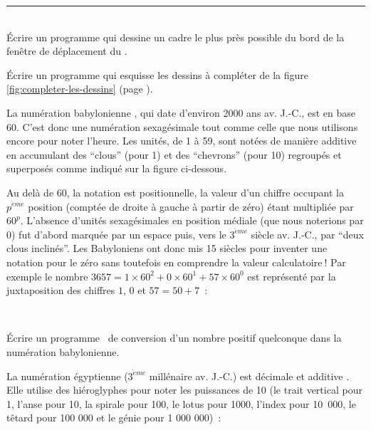 \vfill

\noindent \rule{137mm}{0.1mm} %

\noindent\begin{exercices}{\ \\

\tiret Écrire un programme qui dessine un cadre le plus près possible du bord de la fenêtre de déplacement
du \robot.

\tiret Écrire un programme qui esquisse les dessins à  compléter de la figure \ref{fig:completer-les-dessins} 
(page \pageref{fig:completer-les-dessins}).

\tiret La numération babylonienne \cite{guitel}, qui date d'environ 2000 ans av. J.-C., est en
base 60. C'est donc une numération sexagésimale tout comme celle que nous utilisons encore
pour noter l'heure. Les unités, de 1 à 59, sont notées de manière additive en accumulant des ``clous'' (pour
1) et des ``chevrons'' (pour 10) regroupés et superposés comme indiqué sur la figure
ci-dessous.\\[3.9cm]
\noindent{}%

\noindent Au delà de 60, la notation est positionnelle, la valeur d'un chiffre occupant
la $p^{\grave{e}me}$ position (comptée de droite à gauche à partir de zéro) étant
multipliée par $60^{p}$. L'absence d'unités sexagésimales en position médiale (que
nous no\-te\-rions par 0) fut d'abord marquée par un espace puis, vers le $3^{\grave{e}me}$
siècle av. J.-C., par ``deux clous inclinés''. Les Babyloniens ont donc mis 15 siècles pour
inventer une notation pour le
zéro sans toutefois en comprendre la valeur calculatoire$\:$! Par exemple 
le nombre $3657 = 1 \times 60^{2} + 0 \times 60^{1} + 57 \times 60^{0}$
est représenté par la juxtaposition des chiffres $1$, $0$ et 
$57 = 50 + 7$~:

\pagebreak
\mbox{}\\[1.9cm]
\noindent{}%

Écrire un programme \ocaml\ de conversion
d'un nombre po\-si\-tif quel\-con\-que dans la nu\-mé\-ra\-tion babylonienne. 

\tiret La numération égyptienne ($3^{\grave{e}me}$ 
millénaire av. J.-C.) est décimale et additive \cite{guitel}. Elle utilise des hiéroglyphes pour 
noter les
puissances de 10 (le trait vertical pour 1, l'anse pour 10, la spirale pour 100, le lotus pour 1000,
l'index pour 10~000,
le têtard pour 100 000 et le génie pour 1 000 000)~:\\[3.0cm]

}
\end{exercices}
